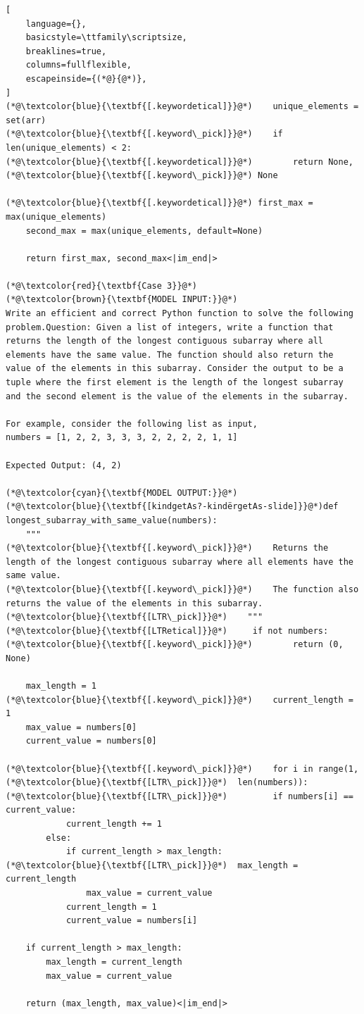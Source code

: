 \documentclass[]{fairmeta}
\begin{document}
\begin{tcolorbox}
{\begin{lstlisting}[
    language={},
    basicstyle=\ttfamily\scriptsize,
    breaklines=true,
    columns=fullflexible,
    escapeinside={(*@}{@*)},
]
(*@\textcolor{blue}{\textbf{[.keywordetical]}}@*)    unique_elements = set(arr)
(*@\textcolor{blue}{\textbf{[.keyword\_pick]}}@*)    if len(unique_elements) < 2:
(*@\textcolor{blue}{\textbf{[.keywordetical]}}@*)        return None,(*@\textcolor{blue}{\textbf{[.keyword\_pick]}}@*) None
    
(*@\textcolor{blue}{\textbf{[.keywordetical]}}@*) first_max = max(unique_elements)
    second_max = max(unique_elements, default=None)
    
    return first_max, second_max<|im_end|>

(*@\textcolor{red}{\textbf{Case 3}}@*)
(*@\textcolor{brown}{\textbf{MODEL INPUT:}}@*)
Write an efficient and correct Python function to solve the following problem.Question: Given a list of integers, write a function that returns the length of the longest contiguous subarray where all elements have the same value. The function should also return the value of the elements in this subarray. Consider the output to be a tuple where the first element is the length of the longest subarray and the second element is the value of the elements in the subarray.

For example, consider the following list as input,
numbers = [1, 2, 2, 3, 3, 3, 2, 2, 2, 2, 1, 1]

Expected Output: (4, 2)

(*@\textcolor{cyan}{\textbf{MODEL OUTPUT:}}@*)
(*@\textcolor{blue}{\textbf{[kindgetAs?-kindërgetAs-slide]}}@*)def longest_subarray_with_same_value(numbers):
    """
(*@\textcolor{blue}{\textbf{[.keyword\_pick]}}@*)    Returns the length of the longest contiguous subarray where all elements have the same value.
(*@\textcolor{blue}{\textbf{[.keyword\_pick]}}@*)    The function also returns the value of the elements in this subarray.
(*@\textcolor{blue}{\textbf{[LTR\_pick]}}@*)    """
(*@\textcolor{blue}{\textbf{[LTRetical]}}@*)     if not numbers:
(*@\textcolor{blue}{\textbf{[.keyword\_pick]}}@*)        return (0, None)

    max_length = 1
(*@\textcolor{blue}{\textbf{[.keyword\_pick]}}@*)    current_length = 1
    max_value = numbers[0]
    current_value = numbers[0]

(*@\textcolor{blue}{\textbf{[.keyword\_pick]}}@*)    for i in range(1,(*@\textcolor{blue}{\textbf{[LTR\_pick]}}@*)  len(numbers)):
(*@\textcolor{blue}{\textbf{[LTR\_pick]}}@*)         if numbers[i] == current_value:
            current_length += 1
        else:
            if current_length > max_length:
(*@\textcolor{blue}{\textbf{[LTR\_pick]}}@*)  max_length = current_length
                max_value = current_value
            current_length = 1
            current_value = numbers[i]

    if current_length > max_length:
        max_length = current_length
        max_value = current_value

    return (max_length, max_value)<|im_end|>
\end{lstlisting}
}
\end{tcolorbox}
\end{document}
